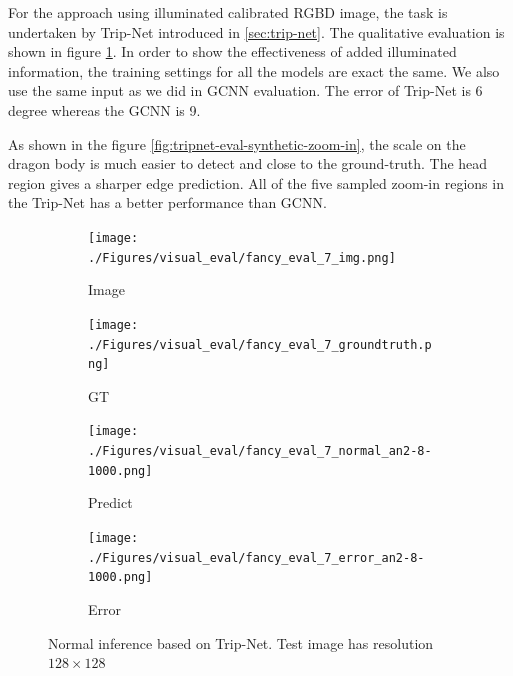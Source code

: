 \documentclass[border=15pt, multi, tikz]{article}
\begin{document}
For the approach using illuminated calibrated RGBD image, the task is undertaken by Trip-Net introduced in \ref{sec:trip-net}. 
The qualitative evaluation is shown in figure \ref{fig:trip-eval}. In order to show the effectiveness of added illuminated information, the training settings for all the models are exact the same. We also use the same input as we did in GCNN evaluation. The error of Trip-Net is 6 degree whereas the GCNN is 9. 

As shown in the figure \ref{fig:tripnet-eval-synthetic-zoom-in}, the scale on the dragon body is much easier to detect and close to the ground-truth. The head region gives a sharper edge prediction. All of the five sampled zoom-in regions in the Trip-Net has a better performance than GCNN.

\begin{figure}[H]
	\centering
	\begin{subfigure}[b]{0.24\linewidth}
		\texttt{[image: ./Figures/visual\_eval/fancy\_eval\_7\_img.png]}
		\caption{Image}
	\end{subfigure}
	\begin{subfigure}[b]{0.24\linewidth}
		\texttt{[image: ./Figures/visual\_eval/fancy\_eval\_7\_groundtruth.png]}
		\caption{GT}
	\end{subfigure}
	\begin{subfigure}[b]{0.24\linewidth}
		\texttt{[image: ./Figures/visual\_eval/fancy\_eval\_7\_normal\_an2-8-1000.png]}
		\caption{Predict}
	\end{subfigure}
	\begin{subfigure}[b]{0.24\linewidth}
		\texttt{[image: ./Figures/visual\_eval/fancy\_eval\_7\_error\_an2-8-1000.png]}
		\caption{Error}
	\end{subfigure}
	
	
	\caption{Normal inference based on Trip-Net. Test image has resolution $ 128\times128 $}
	\label{fig:trip-eval}
\end{figure}
\end{document}
